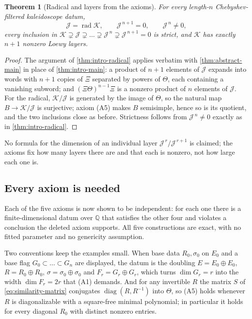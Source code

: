 \documentclass[11pt,reqno]{amsart}
\theoremstyle{plain}
\newtheorem{theorem}{Theorem}[section]
\theoremstyle{definition}
\theoremstyle{remark}
\numberwithin{equation}{section}
\begin{document}
\begin{theorem}[Radical and layers from the axioms]
\label{thm:abstract-radical}
For every length-$n$ Chebyshev-filtered kaleidoscope datum,
\begin{equation*}
  \mathcal{J}=\operatorname{rad}\mathcal{K},
  \qquad
  \mathcal{J}^{\,n+1}=0,
  \qquad
  \mathcal{J}^{\,n}\ne0,
\end{equation*}
every inclusion in
$\mathcal{K}\supsetneq\mathcal{J}\supsetneq\dots\supsetneq\mathcal{J}^{\,n}\supsetneq
\mathcal{J}^{\,n+1}=0$ is strict, and $\mathcal{K}$ has exactly $n+1$ nonzero
Loewy layers.
\end{theorem}

\begin{proof}
The argument of \cref{thm:intro-radical} applies verbatim with
\cref{thm:abstract-main} in place of \cref{thm:intro-main}: a product of $n+1$
elements of $\mathcal{J}$ expands into words with $n+1$ copies of $\Xi$
separated by powers of $\Theta$, each containing a vanishing subword; and
$(\Xi\Theta)^{n-1}\Xi$ is a nonzero product of $n$ elements of $\mathcal{J}$.
For the radical, $\mathcal{K}/\mathcal{J}$ is generated by the image of
$\Theta$, so the natural map $B\to\mathcal{K}/\mathcal{J}$ is surjective;
axiom (A5) makes $B$ semisimple, hence so is its quotient, and the two
inclusions close as before. Strictness follows from
$\mathcal{J}^{\,n}\ne0$ exactly as in \cref{thm:intro-radical}.
\end{proof}

No formula for the dimension of an individual layer
$\mathcal{J}^{\,r}/\mathcal{J}^{\,r+1}$ is claimed; the axioms fix how many
layers there are and that each is nonzero, not how large each one is.

\subsection*{Every axiom is needed}

Each of the five axioms is now shown to be independent: for each one there is a
finite-dimensional datum over $\mathbb{Q}$ that satisfies the other four and
violates a conclusion the deleted axiom supports. All five constructions are
exact, with no fitted parameter and no genericity assumption.

Two conventions keep the examples small. When base data $R_{0},\sigma_{0}$ on
$E_{0}$ and a base flag $G_{0}\subset\dots\subset G_{n}$ are displayed, the
datum is the doubling $E=E_{0}\oplus E_{0}$, $R=R_{0}\oplus R_{0}$,
$\sigma=\sigma_{0}\oplus\sigma_{0}$ and $F_{r}=G_{r}\oplus G_{r}$, which turns
$\dim G_{r}=r$ into the width $\dim F_{r}=2r$ that (A1) demands. And for any
invertible $R$ the matrix $S$ of \cref{eq:similarity-matrix} conjugates
$\operatorname{diag}(R,R^{-1})$ into $\Theta$, so (A5) holds whenever $R$ is
diagonalizable with a square-free minimal polynomial; in particular it holds
for every diagonal $R_{0}$ with distinct nonzero entries.
\end{document}
